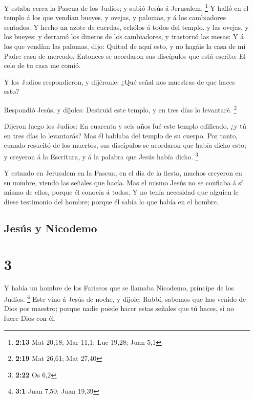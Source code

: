  Y estaba cerca la Pascua de los Judíos; y subió Jesús á
Jerusalem. \footnote{\textbf{2:13} Mat 20,18; Mar 11,1; Luc 19,28; Juan
  5,1}  Y halló en el templo á los que vendían bueyes, y
ovejas, y palomas, y á los cambiadores sentados.  Y hecho
un azote de cuerdas, echólos á todos del templo, y las ovejas, y los
bueyes; y derramó los dineros de los cambiadores, y trastornó las mesas;
 Y á los que vendían las palomas, dijo: Quitad de aquí
esto, y no hagáis la casa de mi Padre casa de mercado. 
Entonces se acordaron sus discípulos que está escrito: El celo de tu
casa me comió.

 Y los Judíos respondieron, y dijéronle: ¿Qué señal nos
muestras de que haces esto?

 Respondió Jesús, y díjoles: Destruid este templo, y en
tres días lo levantaré. \footnote{\textbf{2:19} Mat 26,61; Mat 27,40}

 Dijeron luego los Judíos: En cuarenta y seis años fué
este templo edificado, ¿y tú en tres días lo levantarás? 
Mas él hablaba del templo de su cuerpo.  Por tanto,
cuando resucitó de los muertos, sus discípulos se acordaron que había
dicho esto; y creyeron á la Escritura, y á la palabra que Jesús había
dicho. \footnote{\textbf{2:22} Os 6,2}

 Y estando en Jerusalem en la Pascua, en el día de la
fiesta, muchos creyeron en su nombre, viendo las señales que hacía.
 Mas el mismo Jesús no se confiaba á sí mismo de ellos,
porque él conocía á todos,  Y no tenía necesidad que
alguien le diese testimonio del hombre; porque él sabía lo que había en
el hombre.

\hypertarget{jesuxfas-y-nicodemo}{%
\subsection{Jesús y Nicodemo}\label{jesuxfas-y-nicodemo}}

\hypertarget{section-2}{%
\section{3}\label{section-2}}

 Y había un hombre de los Fariseos que se llamaba
Nicodemo, príncipe de los Judíos. \footnote{\textbf{3:1} Juan 7,50; Juan
  19,39}  Este vino á Jesús de noche, y díjole: Rabbí,
sabemos que has venido de Dios por maestro; porque nadie puede hacer
estas señales que tú haces, si no fuere Dios con él.

